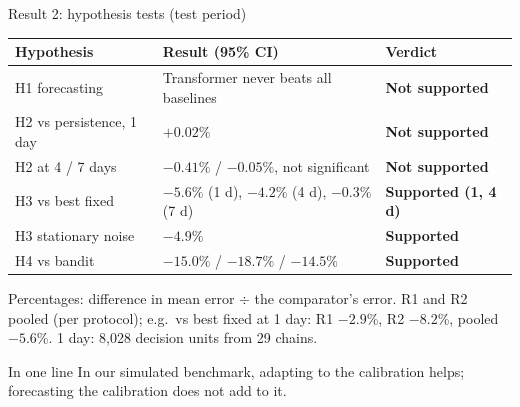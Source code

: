 \documentclass[aspectratio=169,11pt]{beamer}
\newcommand{\good}[1]{\textcolor{qgreen}{\textbf{#1}}}
\newcommand{\bad}[1]{\textcolor{qred}{\textbf{#1}}}
\begin{document}
\begin{frame}{Result 2: hypothesis tests (test period)}
\begin{table}\small
\begin{tabular}{lll}
\toprule
\textbf{Hypothesis} & \textbf{Result (95\% CI)} & \textbf{Verdict} \\
\midrule
H1 forecasting & Transformer never beats all baselines & \bad{Not supported} \\
H2 vs persistence, 1 day & $+0.02\%$ \; [$-0.29$, $+0.54$] & \bad{Not supported} \\
H2 at 4 / 7 days & $-0.41\%$ / $-0.05\%$, not significant & \bad{Not supported} \\
H3 vs best fixed & $-5.6\%$ (1 d), $-4.2\%$ (4 d), $-0.3\%$ (7 d) & \good{Supported (1, 4 d)} \\
H3 stationary noise & $-4.9\%$ \; [$-7.4$, $-1.0$] & \good{Supported} \\
H4 vs bandit & $-15.0\%$ / $-18.7\%$ / $-14.5\%$ & \good{Supported} \\
\bottomrule
\end{tabular}
\end{table}
{\scriptsize Percentages: difference in mean error $\div$ the comparator's error. R1 and R2 pooled (per protocol); e.g.\ vs best fixed at 1 day: R1 $-2.9$\%, R2 $-8.2$\%, pooled $-5.6$\%. 1 day: 8,028 decision units from 29 chains.}
\begin{exampleblock}{In one line}
In our simulated benchmark, adapting to the calibration helps; forecasting the calibration does not add to it.
\end{exampleblock}
\end{frame}
\end{document}
